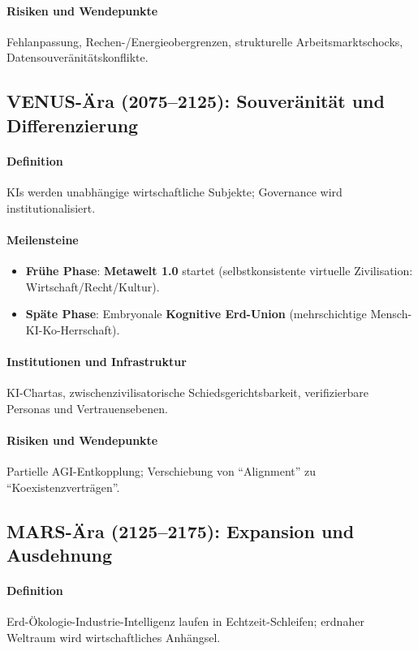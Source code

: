\documentclass[11pt]{article}
\begin{document}
\paragraph{Risiken und Wendepunkte} Fehlanpassung, Rechen-/Energieobergrenzen, strukturelle Arbeitsmarktschocks, Datensouveränitätskonflikte.

\subsection{VENUS-Ära (2075–2125): Souveränität und Differenzierung}
\paragraph{Definition} KIs werden unabhängige wirtschaftliche Subjekte; Governance wird institutionalisiert.

\paragraph{Meilensteine}
\begin{itemize}[noitemsep]
  \item \textbf{Frühe Phase}: \textbf{Metawelt 1.0} startet (selbstkonsistente virtuelle Zivilisation: Wirtschaft/Recht/Kultur).
  \item \textbf{Späte Phase}: Embryonale \textbf{Kognitive Erd-Union} (mehrschichtige Mensch-KI-Ko-Herrschaft).
\end{itemize}

\paragraph{Institutionen und Infrastruktur} KI-Chartas, zwischenzivilisatorische Schiedsgerichtsbarkeit, verifizierbare Personas und Vertrauensebenen.

\paragraph{Risiken und Wendepunkte} Partielle AGI-Entkopplung; Verschiebung von ``Alignment'' zu ``Koexistenzverträgen''.

\subsection{MARS-Ära (2125–2175): Expansion und Ausdehnung}
\paragraph{Definition} Erd-Ökologie-Industrie-Intelligenz laufen in Echtzeit-Schleifen; erdnaher Weltraum wird wirtschaftliches Anhängsel.
\end{document}
